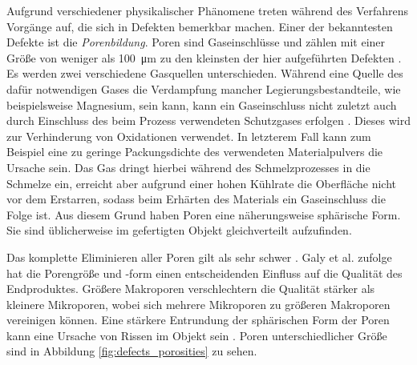 		Aufgrund verschiedener physikalischer Phänomene treten während des Verfahrens Vorgänge
		auf, die sich in Defekten bemerkbar machen. Einer der bekanntesten Defekte ist die
		\emph{Porenbildung}. Poren sind Gaseinschlüsse und zählen mit einer Größe von weniger als
		\SI{100}{\micro\meter} zu den kleinsten der hier aufgeführten Defekten
		\cite{zhang2017defect}. Es werden zwei verschiedene Gasquellen unterschieden. Während eine
		Quelle des dafür notwendigen Gases die Verdampfung mancher Legierungsbestandteile, wie
		beispielsweise Magnesium, sein kann, kann ein Gaseinschluss nicht zuletzt auch durch
		Einschluss des beim Prozess verwendeten Schutzgases erfolgen \cite{galy2018main}. Dieses
		wird zur Verhinderung von Oxidationen verwendet. In letzterem Fall kann zum Beispiel eine
		zu geringe Packungsdichte des verwendeten Materialpulvers die Ursache sein. Das Gas dringt
		hierbei während des Schmelzprozesses in die Schmelze ein, erreicht aber aufgrund einer
		hohen Kühlrate die Oberfläche nicht vor dem Erstarren, sodass beim Erhärten des Materials
		ein Gaseinschluss die Folge ist. Aus diesem Grund haben Poren eine näherungsweise
		sphärische Form. Sie sind üblicherweise im gefertigten Objekt gleichverteilt aufzufinden.

		Das komplette Eliminieren aller Poren gilt als sehr schwer \cite{zhang2017defect}.
		Galy et al. zufolge hat die Porengröße und -form einen entscheidenden Einfluss auf die
		Qualität des Endproduktes. Größere Makroporen verschlechtern die Qualität stärker als
		kleinere Mikroporen, wobei sich mehrere Mikroporen zu größeren Makroporen vereinigen
		können. Eine stärkere Entrundung der sphärischen Form der Poren kann eine Ursache von
		Rissen im Objekt sein \cite{galy2018main}. Poren unterschiedlicher Größe sind in Abbildung
		\ref{fig:defects_porosities} zu sehen.

